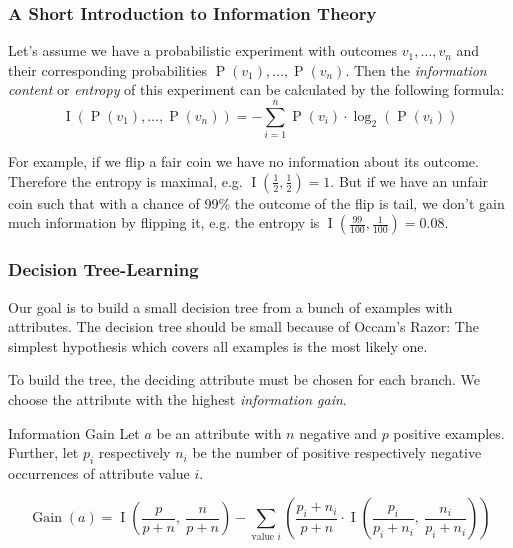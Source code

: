 \documentclass[english]{panikzettel}
\begin{document}
\subsubsection{A Short Introduction to Information Theory}
Let's assume we have a probabilistic experiment with outcomes $v_1,\ldots,v_n$ and their corresponding probabilities $\operatorname P(v_1),\dots,\operatorname P(v_n)$.
Then the \emph{information content} or \emph{entropy} of this experiment can be calculated by the following formula:
\[\operatorname I(\operatorname P(v_1),\dots,\operatorname P(v_n)) = - \sum\limits_{i=1}^n \operatorname{P} (v_i) \cdot \log_2 (\operatorname{P}(v_i)) \]

For example, if we flip a fair coin we have no information about its outcome.
Therefore the entropy is maximal, e.g. $\operatorname I(\frac 12, \frac 12) = 1$.
But if we have an unfair coin such that with a chance of 99\% the outcome of the flip is tail, we don't gain much information by flipping it, e.g. the entropy is $\operatorname I (\frac {99}{100},\frac 1 {100}) = 0.08$.

\subsubsection{Decision Tree-Learning}

Our goal is to build a small decision tree from a bunch of examples with attributes.
The decision tree should be small because of Occam's Razor: The simplest hypothesis which covers all examples is the most likely one.

To build the tree, the deciding attribute must be chosen for each branch.
We choose the attribute with the highest \emph{information gain}.

\begin{defi}{Information Gain}
Let $a$ be an attribute with $n$ negative and $p$ positive examples.
Further, let $p_i$ respectively $n_i$ be the number of positive respectively negative occurrences of attribute value $i$.

\[\operatorname{Gain} (a) = \operatorname{I} \left (\frac{p}{p+n},~ \frac{n}{p+n} \right ) - \sum\limits_\text{value $i$} \left (\frac{p_i + n_i}{p+n} \cdot \operatorname{I} \left ( \frac{p_i}{p_i+n_i},~ \frac{n_i}{p_i+n_i} \right) \right )\]
\end{defi}
\end{document}
